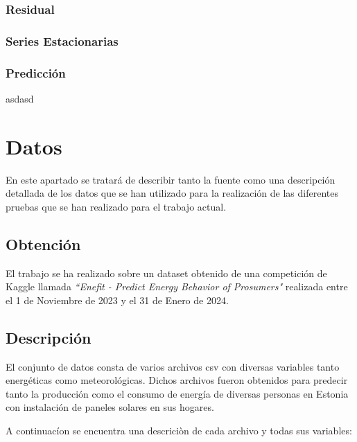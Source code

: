 \documentclass[a4paper,12pt]{article}
\begin{document}
\subsubsection{Residual}

\subsubsection{Series Estacionarias}

\subsubsection{Predicción}

asdasd

\section{Datos}

En este apartado se tratará de describir tanto la fuente como 
una descripción detallada de los datos que se han utilizado
para la realización de las diferentes pruebas que se han 
realizado para el trabajo actual.

\subsection{Obtención}

El trabajo se ha realizado sobre un dataset obtenido de 
una competición de Kaggle llamada 
\textit{``Enefit - Predict Energy Behavior of Prosumers"}
realizada entre el 1 de Noviembre de 2023 y el 31 de 
Enero de 2024.

\subsection{Descripción}

El conjunto de datos consta de varios archivos csv
con diversas variables tanto energéticas como 
meteorológicas. Dichos archivos fueron obtenidos 
para predecir tanto la producción como el consumo
de energía de diversas personas en Estonia con 
instalación de paneles solares en sus hogares.

A continuacíon se encuentra una descriciòn de 
cada archivo y todas sus variables:
\end{document}
